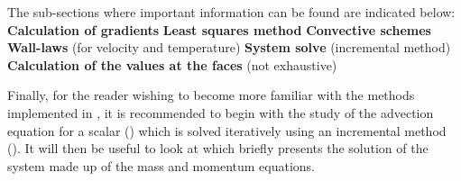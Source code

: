 The sub-sections where important information can be found are indicated
below:\newline
\newline
\nl \newline
\textbf{Calculation of gradients}\newline
\hspace*{1cm}\newline
\textbf{Least squares method}\newline
\hspace*{1cm}\newline
\textbf{Convective schemes}\newline
\hspace*{1cm}\newline
\textbf{Wall-laws} (for velocity and temperature)\newline
\hspace*{1cm}\newline
\hspace*{1cm}\newline
\textbf{System solve} (incremental method)\newline
\hspace*{1cm}\newline
\textbf{Calculation of the values at the faces} (not exhaustive)\newline
\hspace*{1cm}\newline
\hspace*{1cm}\newline

Finally, for the reader wishing to become more familiar with the methods
implemented in \CS, it is recommended to begin with the study of the
advection equation for a scalar () which is solved iteratively
using an incremental method (). It will then be useful to look
at  which briefly presents the solution of the system made up
of the mass and momentum equations.

